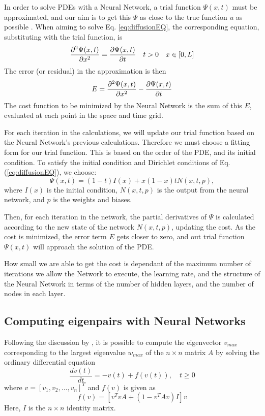 In order to solve PDEs with a Neural Network, a trial function $\Psi (x,t)$ must be approximated, and our aim is to get this $\Psi$ as close to the true function $u$ as possible \citep{lagaris1998artificial}. When aiming to solve Eq. \eqref{eq:diffusionEQ}, the corresponding equation, substituting with the trial function, is
\begin{equation*}
    \pdv[2]{\Psi(x,t)}{x} = \pdv{\Psi(x,t)}{t} \quad t>0 \quad x\in [0,L]
\end{equation*}
The error (or residual) in the approximation is then
\begin{equation}
    E = \pdv[2]{\Psi(x,t)}{x} - \pdv{\Psi(x,t)}{t}
    \label{eq:errorFunc}
\end{equation}
The cost function to be minimized by the Neural Network is the sum of this $E$, evaluated at each point in the space and time grid.

For each iteration in the calculations, we will update our trial function based on the Neural Network's previous calculations. Therefore we must choose a fitting form for our trial function. This is based on the order of the PDE, and its initial condition. To satisfy the initial condition and Dirichlet conditions of Eq. (\ref{eq:diffusionEQ}), we choose:
\begin{equation}
    \Psi (x,t) = (1-t)I(x) + x(1-x)tN(x,t,p),
    \label{eq:trialFunction}
\end{equation}
where $I(x)$ is the initial condition, $N(x,t,p)$ is the output from the neural network, and $p$ is the weights and biases.

Then, for each iteration in the network, the partial derivatives of $\Psi$ is calculated according to the new state of the network $N(x, t, p)$, updating the cost. As the cost is minimized, the error term $E$ gets closer to zero, and out trial function $\Psi (x,t)$ will approach the solution of the PDE.

How small we are able to get the cost is dependant of the maximum number of iterations we allow the Network to execute, the learning rate, and the structure of the Neural Network in terms of the number of hidden layers, and the number of nodes in each layer.

\subsection{Computing eigenpairs with Neural Networks}
Following the discussion by \cite{yi2004neural}, it is possible to compute the eigenvector $v_{max}$ corresponding to the largest eigenvalue $w_{max}$ of the $n\times n$ matrix $A$ by solving the ordinary differential equation
\begin{equation}\label{eq:eigenDE}
	\frac{dv(t)}{dt} = -v(t) + f(v(t)), \quad t\geq 0
\end{equation}
 where $v = [v_1,v_2,\ldots,v_n]^T$ and $f(v)$ is given as
 \begin{equation}\label{eq:f}
 f(v) = \left[v^TvA + \left(1-v^TAv\right)I\right]v
 \end{equation}
Here, $I$ is the $n\times n$ identity matrix.

